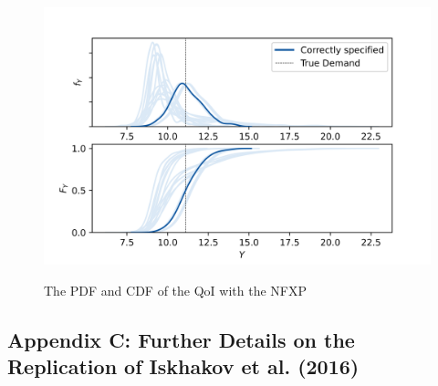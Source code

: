 \begin{figure}[H]
	\caption{The PDF and CDF of the QoI with the NFXP}
	\vspace*{-4mm}
	\centering
	\includegraphics[scale=0.9]{../figures/figure_13.png}
	\label{figure13}
\end{figure}


\newpage
\subsection{Appendix C: Further Details on the Replication of Iskhakov et al. (2016)}

